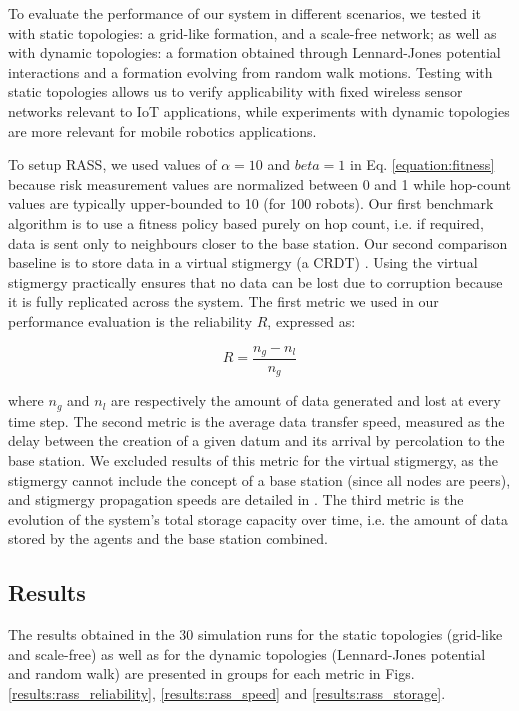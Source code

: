 To evaluate the performance of our system in different scenarios, we tested it with static topologies: a grid-like formation, and a scale-free network; as well as with dynamic topologies: a formation obtained through Lennard-Jones potential interactions and a formation evolving from random walk motions. Testing with static topologies allows us to verify applicability with fixed wireless sensor networks relevant to IoT applications, while experiments with dynamic topologies are more relevant for mobile robotics applications.

To setup \ac{RASS}, we used values of $\alpha = 10$ and $beta = 1$ in Eq. \ref{equation:fitness} because risk measurement values are normalized between 0 and 1 while hop-count values are typically upper-bounded to 10 (for 100 robots). Our first benchmark algorithm is to use a fitness policy based purely on hop count, i.e. if required, data is sent only to neighbours closer to the base station. Our second comparison baseline is to store data in a virtual stigmergy (a \ac{CRDT}) \cite{pinciroliTuple2016}. Using the virtual stigmergy practically ensures that no data can be lost due to corruption because it is fully replicated across the system. The first metric we used in our performance evaluation is the reliability $R$, expressed as:

\begin{equation}
    R = \frac{n_g - n_l}{n_g}
    \label{equation:reliability}
\end{equation}

where $n_g$ and $n_l$ are respectively the amount of data generated and lost at every time step. The second metric is the average data transfer speed, measured as the delay between the creation of a given datum and its arrival by percolation to the base station. We excluded results of this metric for the virtual stigmergy, as the stigmergy cannot include the concept of a base station (since all nodes are peers), and stigmergy propagation speeds are detailed in \cite{pinciroliTuple2016}. The third metric is the evolution of the system's total storage capacity over time, i.e. the amount of data stored by the agents and the base station combined.


\subsection{Results}

The results obtained in the 30 simulation runs for the static topologies (grid-like and scale-free) as well as for the dynamic topologies (Lennard-Jones potential and random walk) are presented in groups for each metric in Figs. \ref{results:rass_reliability}, \ref{results:rass_speed} and \ref{results:rass_storage}.

